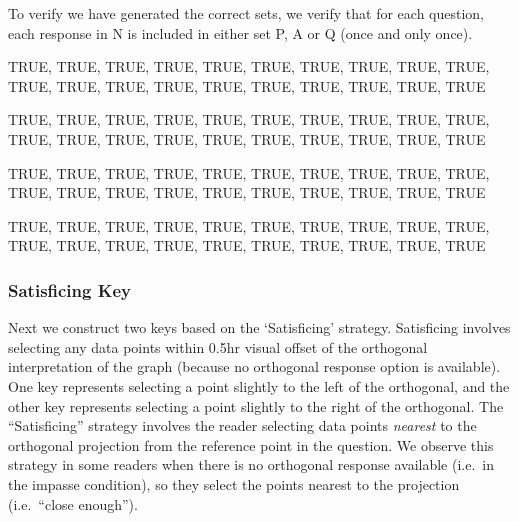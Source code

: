 \documentclass[
  letterpaper,
  DIV=11,
  numbers=noendperiod]{scrreprt}
\begin{document}
To verify we have generated the correct sets, we verify that for each
question, each response in N is included in either set P, A or Q (once
and only once).

TRUE, TRUE, TRUE, TRUE, TRUE, TRUE, TRUE, TRUE, TRUE, TRUE, TRUE, TRUE,
TRUE, TRUE, TRUE, TRUE, TRUE, TRUE, TRUE, TRUE

TRUE, TRUE, TRUE, TRUE, TRUE, TRUE, TRUE, TRUE, TRUE, TRUE, TRUE, TRUE,
TRUE, TRUE, TRUE, TRUE, TRUE, TRUE, TRUE, TRUE

TRUE, TRUE, TRUE, TRUE, TRUE, TRUE, TRUE, TRUE, TRUE, TRUE, TRUE, TRUE,
TRUE, TRUE, TRUE, TRUE, TRUE, TRUE, TRUE, TRUE

TRUE, TRUE, TRUE, TRUE, TRUE, TRUE, TRUE, TRUE, TRUE, TRUE, TRUE, TRUE,
TRUE, TRUE, TRUE, TRUE, TRUE, TRUE, TRUE, TRUE

\hypertarget{satisficing-key}{%
\subsubsection{Satisficing Key}\label{satisficing-key}}

Next we construct two keys based on the `Satisficing' strategy.
Satisficing involves selecting any data points within 0.5hr visual
offset of the orthogonal interpretation of the graph (because no
orthogonal response option is available). One key represents selecting a
point slightly to the left of the orthogonal, and the other key
represents selecting a point slightly to the right of the orthogonal.
The ``Satisficing'' strategy involves the reader selecting data points
\emph{nearest} to the orthogonal projection from the reference point in
the question. We observe this strategy in some readers when there is no
orthogonal response available (i.e.~in the impasse condition), so they
select the points nearest to the projection (i.e.~``close enough'').
\end{document}
